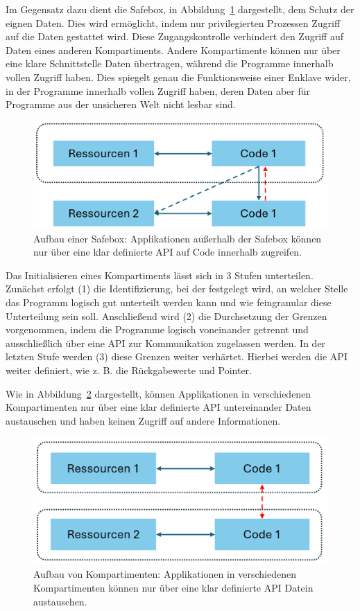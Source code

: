 Im Gegensatz dazu dient die Safebox, in Abbildung~\ref{fig:Safebox} dargestellt, dem Schutz der eignen Daten. Dies wird ermöglicht, indem nur privilegierten Prozessen Zugriff auf die Daten gestattet wird. Diese Zugangskontrolle verhindert den Zugriff auf Daten eines anderen Kompartiments. Andere Kompartimente können nur über eine klare Schnittstelle Daten übertragen, während die Programme innerhalb vollen Zugriff haben. 
Dies spiegelt genau die Funktionsweise einer Enklave wider, in der Programme innerhalb vollen Zugriff haben, deren Daten aber für Programme aus der unsicheren Welt nicht lesbar sind.
\begin{figure}[h]
    \centering
    \includegraphics[width=0.67\linewidth]{Grafiken/Safebox.png}
    \caption{Aufbau einer Safebox: Applikationen außerhalb der Safebox können nur über eine klar definierte API auf Code innerhalb zugreifen.}
    \label{fig:Safebox}
\end{figure}

Das Initialisieren eines Kompartiments lässt sich in 3 Stufen unterteilen. Zunächst erfolgt (1) die Identifizierung, bei der festgelegt wird, an welcher Stelle das Programm logisch gut unterteilt werden kann und wie feingranular diese Unterteilung sein soll.
Anschließend wird (2) die Durchsetzung der Grenzen vorgenommen, indem die Programme logisch voneinander getrennt und ausschließlich über eine API zur Kommunikation zugelassen werden. 
In der letzten Stufe werden (3) diese Grenzen weiter verhärtet. Hierbei werden die API weiter definiert, wie z. B. die Rückgabewerte und Pointer.

Wie in Abbildung~\ref{fig:Kompartiment} dargestellt, können Applikationen in verschiedenen Kompartimenten nur über eine klar definierte API untereinander Daten austauschen und haben keinen Zugriff auf andere Informationen.

\begin{figure}[h]
    \centering
    \includegraphics[width=0.67\linewidth]{Grafiken/Kompartiment.png}
    \caption{Aufbau von Kompartimenten: Applikationen in verschiedenen Kompartimenten können nur über eine klar definierte API Datein austauschen.}
    \label{fig:Kompartiment}
\end{figure}

